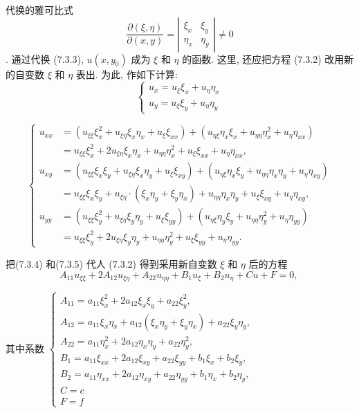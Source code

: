 代换的雅可比式
$$\frac{\partial(\xi, \eta)}{\partial(x, y)} = \left|\begin{array}{ll}
    \xi_x & \xi_y \\
    \eta_x & \eta_y
    \end{array}\right|
\neq 0$$.
 通过代换 (7.3.3), $u\left(x, y_0\right)$ 成为 $\xi$ 和 $\eta$ 的函数. 这里, 还应把方程 (7.3.2) 改用新的自变数 $\xi$ 和 $\eta$ 表出. 为此, 作如下计算:
$$
\left\{\begin{array}{l}
u_x=u_{\xi} \xi_x+u_\eta \eta_x \\
u_y=u_{\xi} \xi_y+u_\eta \eta_y
\end{array}\right.
$$


$$
\left\{\begin{aligned}
u_{x x} & =\left(u_{\xi \xi} \xi_x^2+u_{\xi \eta} \xi_x \eta_x+u_{\xi} \xi_{x x}\right)+\left(u_{\eta \xi} \eta_x \xi_x+u_{\eta \eta} \eta_x^2+u_\eta \eta_{x x}\right) \\
& =u_{\xi \xi} \xi_x^2+2 u_{\xi \eta} \xi_x \eta_x+u_{\eta \eta} \eta_x^2+u_{\xi} \xi_{x x}+u_\eta \eta_{x x}, \\
u_{x y} & =\left(u_{\xi \xi} \xi_x \xi_y+u_{\xi \eta} \xi_x \eta_y+u_{\xi} \xi_{x y}\right)+\left(u_{\eta \xi} \eta_x \xi_y+u_{\eta \eta} \eta_x \eta_y+u_\eta \eta_{x y}\right) \\
& =u_{\xi \xi} \xi_x \xi_y+u_{\xi \eta} \cdot\left(\xi_x \eta_y+\xi_y \eta_x\right)+u_{\eta \eta} \eta_x \eta_y+u_{\xi} \xi_{x y}+u_\eta \eta_{x y}, \\
u_{y y} & =\left(u_{\xi \xi} \xi_y^2+u_{\xi \eta} \xi_y \eta_y+u_{\xi} \xi_{y y}\right)+\left(u_{\eta \xi} \eta_y \xi_y+u_{\eta \eta} \eta_y^2+u_\eta \eta_{y y}\right) \\
& =u_{\xi \xi} \xi_y^2+2 u_{\xi \eta} \xi_y \eta_y+u_{\eta \eta} \eta_y^2+u_{\xi} \xi_{y y}+u_\eta \eta_{y y} .
\end{aligned}\right.
$$

把(7.3.4) 和(7.3.5) 代人 (7.3.2) 得到采用新自变数 $\xi$ 和 $\eta$ 后的方程
$$
A_{11} u_{\xi \xi}+2 A_{12} u_{\xi \eta}+A_{22} u_{\eta \eta}+B_1 u_{\xi}+B_2 u_\eta+C u+F=0 \text {, }
$$

其中系数
$\left\{\begin{array}{l}A_{11}=a_{11} \xi_x^2+2 a_{12} \xi_x \xi_y+a_{22} \xi_y^2, \\ A_{12}=a_{11} \xi_x \eta_x+a_{12}\left(\xi_x \eta_y+\xi_y \eta_x\right)+a_{22} \xi_y \eta_y, \\ A_{22}=a_{11} \eta_x^2+2 a_{12} \eta_x \eta_y+a_{22} \eta_y^2, 
    \\ B_1=a_{11} \xi_{x x}+2 a_{12} \xi_{x y}+a_{22} \xi_{y y}+b_1 \xi_x+b_2 \xi_y, \\ B_2=a_{11} \eta_{x x}+2 a_{12} \eta_{x y}+a_{22} \eta_{y y}+b_1 \eta_x+b_2 \eta_y, \\ C=c \\ F=f\end{array}\right.$

